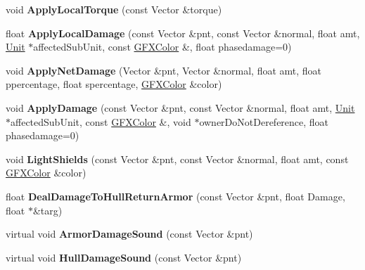 \begin{DoxyCompactItemize}
\item 
void {\bfseries Apply\+Local\+Torque} (const Vector \&torque)\hypertarget{classUnit_abcdd828662bec22a553416bc2cbf0e37}{}\label{classUnit_abcdd828662bec22a553416bc2cbf0e37}

\item 
float {\bfseries Apply\+Local\+Damage} (const Vector \&pnt, const Vector \&normal, float amt, \hyperlink{classUnit}{Unit} $\ast$affected\+Sub\+Unit, const \hyperlink{structGFXColor}{G\+F\+X\+Color} \&, float phasedamage=0)\hypertarget{classUnit_a0283d60ec06daf6dcfd583140e453cbd}{}\label{classUnit_a0283d60ec06daf6dcfd583140e453cbd}

\item 
void {\bfseries Apply\+Net\+Damage} (Vector \&pnt, Vector \&normal, float amt, float ppercentage, float spercentage, \hyperlink{structGFXColor}{G\+F\+X\+Color} \&color)\hypertarget{classUnit_ab98bf26804823c8011eeaf567a1f9a7a}{}\label{classUnit_ab98bf26804823c8011eeaf567a1f9a7a}

\item 
void {\bfseries Apply\+Damage} (const Vector \&pnt, const Vector \&normal, float amt, \hyperlink{classUnit}{Unit} $\ast$affected\+Sub\+Unit, const \hyperlink{structGFXColor}{G\+F\+X\+Color} \&, void $\ast$owner\+Do\+Not\+Dereference, float phasedamage=0)\hypertarget{classUnit_a09f948e3648834b67fed8fdebb96735e}{}\label{classUnit_a09f948e3648834b67fed8fdebb96735e}

\item 
void {\bfseries Light\+Shields} (const Vector \&pnt, const Vector \&normal, float amt, const \hyperlink{structGFXColor}{G\+F\+X\+Color} \&color)\hypertarget{classUnit_ad024641a5d0944ac6b6c9472f26965d6}{}\label{classUnit_ad024641a5d0944ac6b6c9472f26965d6}

\item 
float {\bfseries Deal\+Damage\+To\+Hull\+Return\+Armor} (const Vector \&pnt, float Damage, float $\ast$\&targ)\hypertarget{classUnit_a2ead1519dbf5806e4d413ed567cb0f05}{}\label{classUnit_a2ead1519dbf5806e4d413ed567cb0f05}

\item 
virtual void {\bfseries Armor\+Damage\+Sound} (const Vector \&pnt)\hypertarget{classUnit_a01238b92c3d4318e8e529679c6f5cc44}{}\label{classUnit_a01238b92c3d4318e8e529679c6f5cc44}

\item 
virtual void {\bfseries Hull\+Damage\+Sound} (const Vector \&pnt)\hypertarget{classUnit_aaf2d2eaf62dd423ebaf389e7a9f3d4c7}{}\label{classUnit_aaf2d2eaf62dd423ebaf389e7a9f3d4c7}


\end{DoxyCompactItemize}
